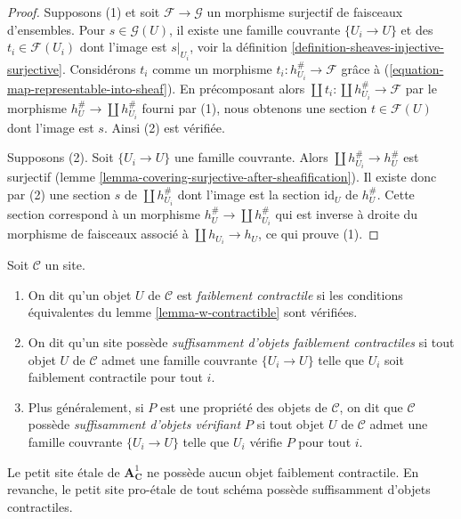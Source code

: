 \begin{proof}
Supposons (1) et soit $\mathcal{F} \to \mathcal{G}$ un morphisme surjectif de
faisceaux d’ensembles. Pour $s \in \mathcal{G}(U)$, il existe une famille couvrante
$\{U_i \to U\}$ et des $t_i \in \mathcal{F}(U_i)$ dont l’image est
$s|_{U_i}$, voir la définition \ref{definition-sheaves-injective-surjective}.
Considérons $t_i$ comme un morphisme $t_i : h_{U_i}^\# \to \mathcal{F}$ grâce à
(\ref{equation-map-representable-into-sheaf}).
En précomposant alors $\coprod t_i : \coprod h_{U_i}^\# \to \mathcal{F}$
par le morphisme $h_U^\# \to \coprod h_{U_i}^\#$ fourni par (1),
nous obtenons une section $t \in \mathcal{F}(U)$ dont l’image est $s$.
Ainsi (2) est vérifiée.

\medskip\noindent
Supposons (2). Soit $\{U_i \to U\}$ une famille couvrante.
Alors $\coprod h_{U_i}^\# \to h_U^\#$ est surjectif
(lemme \ref{lemma-covering-surjective-after-sheafification}).
Il existe donc par (2) une section $s$ de $\coprod h_{U_i}^\#$ dont l’image
est la section $\text{id}_U$ de $h_U^\#$. Cette section correspond à un morphisme
$h_U^\# \to \coprod h_{U_i}^\#$ qui est inverse à droite du morphisme de
faisceaux associé à $\coprod h_{U_i} \to h_U$, ce qui prouve (1).
\end{proof}

\begin{definition}
\label{definition-w-contractible}
Soit $\mathcal{C}$ un site.
\begin{enumerate}
\item On dit qu’un objet $U$ de $\mathcal{C}$ est {\it faiblement contractile}
si les conditions équivalentes du lemme \ref{lemma-w-contractible} sont vérifiées.
\item On dit qu’un site possède {\it suffisamment d’objets faiblement contractiles}
si tout objet $U$ de $\mathcal{C}$ admet une famille couvrante $\{U_i \to U\}$
telle que $U_i$ soit faiblement contractile pour tout $i$.
\item Plus généralement, si $P$ est une propriété des objets de $\mathcal{C}$,
on dit que $\mathcal{C}$ possède {\it suffisamment d’objets vérifiant $P$} si tout objet $U$ de
$\mathcal{C}$ admet une famille couvrante $\{U_i \to U\}$ telle que $U_i$ vérifie $P$
pour tout $i$.
\end{enumerate}
\end{definition}

\noindent
Le petit site \'etale de $\mathbf{A}^1_\mathbf{C}$ ne possède aucun
objet faiblement contractile. En revanche, le petit site
pro-\'etale de tout schéma possède suffisamment d’objets contractiles.







